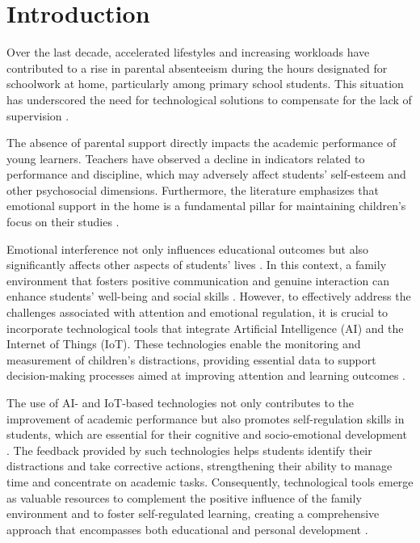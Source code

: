 	\section{Introduction}
	\label{section:first}
		Over the last decade, accelerated lifestyles and increasing workloads have contributed to a rise in parental absenteeism during the hours designated for schoolwork at home, particularly among primary school students. This situation has underscored the need for technological solutions to compensate for the lack of supervision \citep{Seidu2022Truancy,Ketsman2025Mapping}.
		
		The absence of parental support directly impacts the academic performance of young learners. Teachers have observed a decline in indicators related to performance and discipline, which may adversely affect students’ self-esteem and other psychosocial dimensions. Furthermore, the literature emphasizes that emotional support in the home is a fundamental pillar for maintaining children’s focus on their studies \citep{Seidu2022Truancy}.
		
		Emotional interference not only influences educational outcomes but also significantly affects other aspects of students’ lives \citep{Ake2023}. In this context, a family environment that fosters positive communication and genuine interaction can enhance students’ well-being and social skills \citep{Navarro2024}. However, to effectively address the challenges associated with attention and emotional regulation, it is crucial to incorporate technological tools that integrate Artificial Intelligence (AI) and the Internet of Things (IoT). These technologies enable the monitoring and measurement of children's distractions, providing essential data to support decision-making processes aimed at improving attention and learning outcomes \citep{Alvear-Puertas2017,Berrezueta-Guzman2021}.
		
		The use of AI- and IoT-based technologies not only contributes to the improvement of academic performance but also promotes self-regulation skills in students, which are essential for their cognitive and socio-emotional development \citep{Mohamed2018Implementing}. The feedback provided by such technologies helps students identify their distractions and take corrective actions, strengthening their ability to manage time and concentrate on academic tasks. Consequently, technological tools emerge as valuable resources to complement the positive influence of the family environment and to foster self-regulated learning, creating a comprehensive approach that encompasses both educational and personal development \citep{Thinyane2016AUG}.
		
